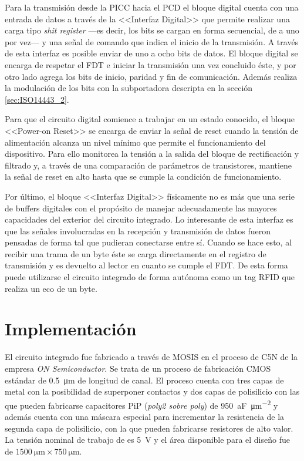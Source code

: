 Para la transmisión desde la PICC hacia el PCD el bloque digital cuenta con 
una entrada de datos a través de la <<Interfaz Digital>> que permite 
realizar una carga tipo \emph{shit register} ---es decir, los bits se cargan 
en forma secuencial, de a uno por vez--- y una señal de comando que indica 
el inicio de la transmisión. A través de esta interfaz es posible enviar de 
uno a ocho bits de datos. El bloque digital se encarga de respetar el FDT e 
iniciar la transmisión una vez concluido éste, y por otro lado agrega los 
bits de inicio, paridad y fin de comunicación. Además realiza la modulación 
de los bits con la subportadora descripta en la sección \ref{sec:ISO14443_2}.

Para que el circuito digital comience a trabajar en un estado conocido, el 
bloque <<Power-on Reset>> se encarga de enviar la señal de reset cuando la 
tensión de alimentación alcanza un nivel mínimo que permite el 
funcionamiento del dispositivo. Para ello monitorea la tensión a la salida 
del bloque de rectificación y filtrado y, a través de una comparación de 
parámetros de transistores, mantiene la señal de reset en alto hasta que se 
cumple la condición de funcionamiento.

Por último, el bloque <<Interfaz Digital>> físicamente no es más que una 
serie de buffers digitales con el propósito de manejar adecuadamente las 
mayores capacidades del exterior del circuito integrado. Lo interesante de 
esta interfaz es que las señales involucradas en la recepción y transmisión 
de datos fueron pensadas de forma tal que pudieran conectarse entre sí. 
Cuando se hace esto, al recibir una trama de un byte éste se carga 
directamente en el registro de transmisión y es devuelto al lector en cuanto 
se cumple el FDT. De esta forma puede utilizarse el circuito integrado de 
forma autónoma como un tag RFID que realiza un eco de un byte.

\section{Implementación}

El circuito integrado fue fabricado a través de MOSIS \cite{MosisWeb} en 
el proceso de C5N de la empresa \emph{ON Semiconductor}. Se trata de 
un proceso de fabricación CMOS estándar de \SI{0.5}{\micro\meter} de 
longitud de canal. El proceso cuenta con tres capas de metal con la 
posibilidad de superponer contactos y dos capas de polisilicio con las 
que pueden fabricarse capacitores PiP (\emph{poly2 sobre poly}) de 
\SI[per-mode=symbol]{950}{\atto\farad\per\micro\meter\squared} y 
además cuenta con una máscara especial para incrementar la 
resistencia de la segunda capa de polisilicio, con la que pueden 
fabricarse resistores de alto valor. La tensión nominal de trabajo de 
es \SI{5}{\volt} y el área disponible para el diseño fue de 
\(\SI{1500}{\micro\meter}\times\SI{750}{\micro\meter}\).

